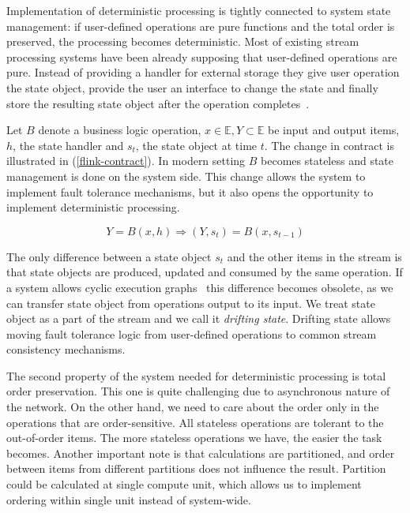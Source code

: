 
\label{motivation-section}

Implementation of deterministic processing is tightly connected to system state management: if user-defined operations are pure functions and the total order is preserved, the processing becomes deterministic. Most of existing stream processing systems have been already supposing that user-defined operations are pure. Instead of providing a handler for external storage they give user operation the state object, provide the user an interface to change the state and finally store the resulting state object after the operation completes~\cite{carbone2015apache, apache:storm, Noghabi:2017:SSS:3137765.3137770}.

Let $B$ denote a business logic operation, $x \in \mathbb{E}, Y \subset \mathbb{E}$ be input and output items, $h$, the state handler and $s_t$, the state object at time $t$. The change in contract is illustrated in (\ref{flink-contract}). In modern setting $B$ becomes stateless and state management is done on the system side. This change allows the system to implement fault tolerance mechanisms, but it also opens the opportunity to implement deterministic processing.

\begin{equation}
  \label{flink-contract}
  Y = B(x, h) \Rightarrow (Y, s_t) = B(x, s_{t-1}) 
\end{equation}

The only difference between a state object $s_t$ and the other items in the stream is that state objects are produced, updated and consumed by the same operation. If a system allows cyclic execution graphs~\cite{Murray:2013:NTD:2517349.2522738} this difference becomes obsolete, as we can transfer state object from operations output to its input. We treat state object as a part of the stream and we call it {\it drifting state}. Drifting state allows moving fault tolerance logic from user-defined operations to common stream consistency mechanisms.

The second property of the system needed for deterministic processing is total order preservation. This one is quite challenging due to asynchronous nature of the network. On the other hand, we need to care about the order only in the operations that are order-sensitive. All stateless operations are tolerant to the out-of-order items. The more stateless operations we have, the easier the task becomes. Another important note is that calculations are partitioned, and order between items from different partitions does not influence the result. Partition could be calculated at single compute unit, which allows us to implement ordering within single unit instead of system-wide.

